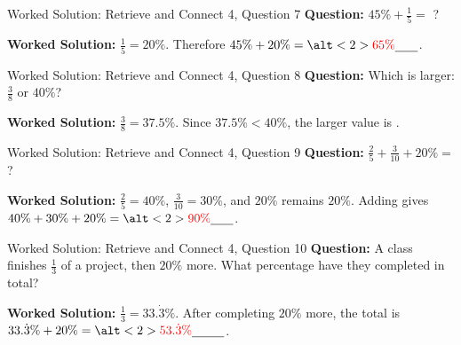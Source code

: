 \documentclass{beamer}
\newcommand{\ablank}[1]{%
  \alt<2>{\textcolor{red}{#1}}{\underline{\phantom{#1}}}%
}
\begin{document}
\begin{frame}[t]{Worked Solution: Retrieve and Connect 4, Question 7}
\textbf{Question:} \(45\% + \frac{1}{5} =\) ?

\smallskip
\textbf{Worked Solution:} \(\frac{1}{5} = 20\%\). Therefore \(45\% + 20\% = \ablank{65\%}\).
\end{frame}

\begin{frame}[t]{Worked Solution: Retrieve and Connect 4, Question 8}
\textbf{Question:} Which is larger: \(\frac{3}{8}\) or \(40\%\)?

\smallskip
\textbf{Worked Solution:} \(\frac{3}{8} = 37.5\%\). Since \(37.5\% < 40\%\), the larger value is \ablank{$40\%$}.
\end{frame}

\begin{frame}[t]{Worked Solution: Retrieve and Connect 4, Question 9}
\textbf{Question:} \(\frac{2}{5} + \frac{3}{10} + 20\% =\) ?

\smallskip
\textbf{Worked Solution:} \(\frac{2}{5} = 40\%\), \(\frac{3}{10} = 30\%\), and \(20\%\) remains \(20\%\). Adding gives \(40\% + 30\% + 20\% = \ablank{90\%}\).
\end{frame}

\begin{frame}[t]{Worked Solution: Retrieve and Connect 4, Question 10}
\textbf{Question:} A class finishes \(\frac{1}{3}\) of a project, then \(20\%\) more. What percentage have they completed in total?

\smallskip
\textbf{Worked Solution:} \(\frac{1}{3} = 33.\dot{3}\%\). After completing \(20\%\) more, the total is \(33.\dot{3}\% + 20\% = \ablank{53.\dot{3}\%}\).
\end{frame}
\end{document}
